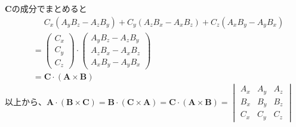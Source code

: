 \documentclass[a4paper,12pt]{jlreq}
\begin{document}
\(\bm{C}\)の成分でまとめると
\begin{align*}
     & \phantom{{}={}} C_x\left(A_yB_z-A_zB_y\right)+C_y\left(A_zB_x-A_xB_z\right)+C_z\left(A_xB_y-A_yB_x\right)              \\
     & =\begin{pmatrix}C_x\\C_y\\C_z\end{pmatrix}\cdot\begin{pmatrix}A_yB_z-A_zB_y\\A_zB_x-A_xB_z\\A_xB_y-A_yB_x\end{pmatrix} \\
     & =\bm{C}\cdot\left(\bm{A}\times\bm{B}\right)
\end{align*}
以上から、\(\displaystyle \bm{A}\cdot\left(\bm{B}\times\bm{C}\right)=\bm{B}\cdot\left(\bm{C}\times\bm{A}\right)=\bm{C}\cdot\left(\bm{A}\times\bm{B}\right)=\begin{vmatrix}A_x&A_y&A_z\\B_x&B_y&B_z\\C_x&C_y&C_z\end{vmatrix}\)
\end{document}
